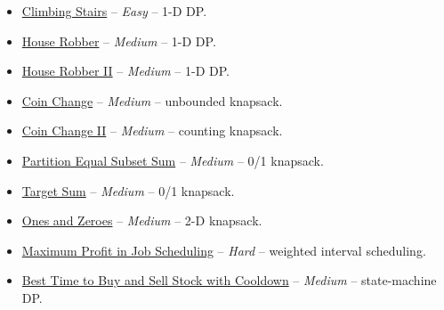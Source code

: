 \documentclass[11pt]{article}
\begin{document}
\begin{itemize}
  \item \href{https://leetcode.com/problems/climbing-stairs/}{Climbing Stairs} -- \emph{Easy} -- 1-D DP.
  \item \href{https://leetcode.com/problems/house-robber/}{House Robber} -- \emph{Medium} -- 1-D DP.
  \item \href{https://leetcode.com/problems/house-robber-ii/}{House Robber II} -- \emph{Medium} -- 1-D DP.
  \item \href{https://leetcode.com/problems/coin-change/}{Coin Change} -- \emph{Medium} -- unbounded knapsack.
  \item \href{https://leetcode.com/problems/coin-change-2/}{Coin Change II} -- \emph{Medium} -- counting knapsack.
  \item \href{https://leetcode.com/problems/partition-equal-subset-sum/}{Partition Equal Subset Sum} -- \emph{Medium} -- 0/1 knapsack.
  \item \href{https://leetcode.com/problems/target-sum/}{Target Sum} -- \emph{Medium} -- 0/1 knapsack.
  \item \href{https://leetcode.com/problems/ones-and-zeroes/}{Ones and Zeroes} -- \emph{Medium} -- 2-D knapsack.
  \item \href{https://leetcode.com/problems/maximum-profit-in-job-scheduling/}{Maximum Profit in Job Scheduling} -- \emph{Hard} -- weighted interval scheduling.
  \item \href{https://leetcode.com/problems/best-time-to-buy-and-sell-stock-with-cooldown/}{Best Time to Buy and Sell Stock with Cooldown} -- \emph{Medium} -- state-machine DP.
\end{itemize}
\end{document}
